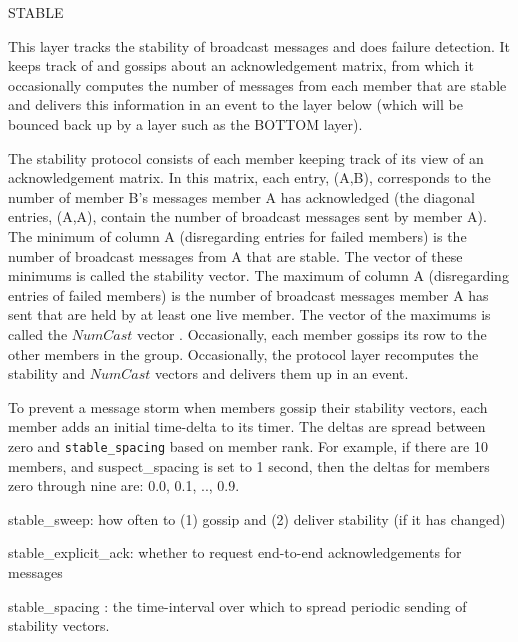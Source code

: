 \begin{Layer}{STABLE}

This layer tracks the stability of broadcast messages and does
failure detection.  It keeps track of and gossips about an
acknowledgement matrix, from which it occasionally computes the
number of messages from each member that are stable and delivers this
information in an  event to the layer below (which will be
bounced back up by a layer such as the BOTTOM layer).

\begin{Protocol}
The stability protocol consists of each member keeping track of its
view of an acknowledgement matrix.  In this matrix, each entry,
(A,B), corresponds to the number of member B's messages member A has
acknowledged (the diagonal entries, (A,A), contain the number of
broadcast messages sent by member A).  The minimum of column A
(disregarding entries for failed members) is the number of broadcast
messages from A that are stable.  The vector of these minimums is
called the stability vector.  The maximum of column A (disregarding
entries of failed members) is the number of broadcast messages member
A has sent that are held by at least one live member.  The vector of
the maximums is called the $NumCast$ vector .  Occasionally, each member gossips its row to the
other members in the group.  Occasionally, the protocol layer
recomputes the stability and $NumCast$ vectors and delivers them up
in an  event.

To prevent a message storm when members gossip their stability
vectors, each member adds an initial time-delta to its timer. The
deltas are spread between zero and {\tt stable\_spacing} based on
member rank.  For example, if there are 10 members, and
suspect\_spacing is set to 1 second, then the deltas for members zero
through nine are: 0.0, 0.1, .., 0.9. 
\end{Protocol}

\begin{Parameters}
\item 
stable\_sweep: how often to (1) gossip and (2) deliver stability (if
it has changed)
\item 
stable\_explicit\_ack: whether to request end-to-end acknowledgements
for messages
\item
stable\_spacing : the time-interval over which to spread periodic
sending of stability vectors.
\end{Parameters}


\end{Layer}
